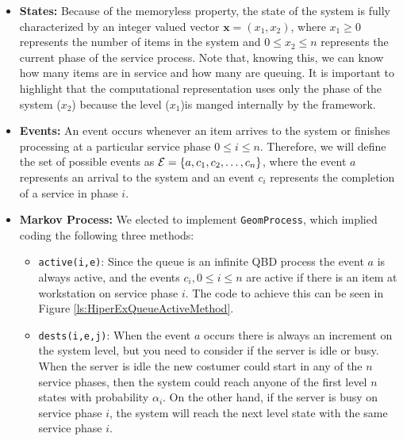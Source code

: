 \documentclass[11pt,letterpaper]{article}
\newcommand{\cE}{{\cal E}}
\newcommand{\bx}{\mathbf{x}}
\newcommand{\Active}{\texttt{active}\xspace}
\newcommand{\Dests}{\texttt{dests}\xspace}
\newcommand\GeomProcess{\texttt{Geom\-Pro\-cess}\xspace}
\begin{document}
\begin{itemize}
    \item \textbf{States:} Because of the memoryless property,
    the state of the system is fully characterized by an
    integer valued vector $\bx=(x_1, x_2)$, where $x_1 \geq 0$
    represents the number of items in the system and $0 \leq x_2 \leq n$
    represents the current phase of the service process.%
    Note that, knowing this, we can know how many 
    items are in service and how many are queuing. %
    It is important to highlight that the computational representation uses only the 
    phase of the system ($x_2$) because the level ($x_1$)is manged internally by the framework. %
    \item \textbf{Events:} An event occurs whenever an
    item arrives to the system or finishes processing at
    a particular service phase $0 \leq i \leq n$. %
    Therefore, we will define the set of possible events as
    $\cE =\{a, c_1, c_2, \ldots, c_n\} $, where the event $a$ 
    represents an arrival to the system and an event $c_i$ represents
    the completion of a service in phase $i$. 

\item   \textbf{Markov Process:} We elected to implement
\GeomProcess, which implied coding the following three methods:
\begin{itemize}
    \item \Active\texttt{(i,e)}: Since the queue is an infinite QBD
    process the event $a$ is always active, and the events
    $c_i, 0 \leq i \leq n$ are active
    if there is an item at workstation on service phase $i$. %
    The code to achieve this can be seen in Figure
    \ref{ls:HiperExQueueActiveMethod}. %
    \item \Dests\texttt{(i,e,j)}: When the event $a$ occurs there is always an
    increment on the system level, but you need to consider if the server is idle or busy. %
    When the server is idle the new costumer could start in any of the 
    $n$ service phases, then the system could reach anyone of the first level
    $n$ states with probability $\alpha_i$. On the other hand, if the server is 
    busy on service phase $i$, the system will reach the next level state with 
    the same service phase $i$. %
    

\end{itemize}
\end{itemize}
\end{document}
